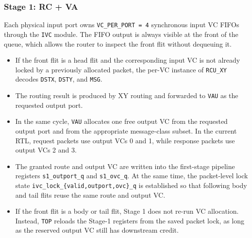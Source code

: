 \documentclass[11pt,a4paper]{article}
\begin{document}
\subsubsection{Stage 1: RC + VA}
Each physical input port owns \texttt{VC\_PER\_PORT = 4} synchronous input VC FIFOs through the \texttt{IVC} module. The FIFO output is always visible at the front of the queue, which allows the router to inspect the front flit without dequeuing it.
\begin{itemize}
    \item If the front flit is a head flit and the corresponding input VC is not already locked by a previously allocated packet, the per-VC instance of \texttt{RCU\_XY} decodes \texttt{DSTX}, \texttt{DSTY}, and \texttt{MSG}.
    \item The routing result is produced by XY routing and forwarded to \texttt{VAU} as the requested output port.
    \item In the same cycle, \texttt{VAU} allocates one free output VC from the requested output port and from the appropriate message-class subset. In the current RTL, request packets use output VCs 0 and 1, while response packets use output VCs 2 and 3.
    \item The granted route and output VC are written into the first-stage pipeline registers \texttt{s1\_outport\_q} and \texttt{s1\_ovc\_q}. At the same time, the packet-level lock state \texttt{ivc\_lock\_\{valid,outport,ovc\}\_q} is established so that following body and tail flits reuse the same route and output VC.
    \item If the front flit is a body or tail flit, Stage 1 does not re-run VC allocation. Instead, \texttt{TOP} reloads the Stage-1 registers from the saved packet lock, as long as the reserved output VC still has downstream credit.
\end{itemize}
\end{document}
